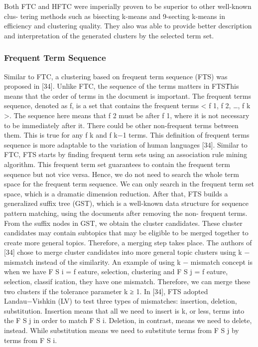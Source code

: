 \documentclass{VUMIFInfKursinis}
\begin{document}
Both FTC and HFTC were imperially proven to be superior to other well-known clus- tering methods such as bisecting k-means and 9-secting k-means in efficiency and clustering quality. They also was able to provide better description and interpretation of the generated clusters by the selected term set.

\subsubsection{Frequent Term Sequence}
Similar to FTC, a clustering based on frequent term sequence (FTS) was proposed in [34]. Unlike FTC, the sequence of the terms matters in FTS\. This means that the order of terms in the document is important. The frequent terms sequence, denoted as f, is a set that contains the frequent terms < f 1, f 2, \ldots, f k >. The sequence here means that f 2 must be after f 1, where it is not necessary to be immediately after it. There could be other non-frequent terms between them. This is true for any f k and f k−1 terms. This definition of frequent terms sequence is more adaptable to the variation of human languages [34].
Similar to FTC, FTS starts by finding frequent term sets using an association rule mining algorithm. This frequent term set guarantees to contain the frequent term sequence but not vice versa. Hence, we do not need to search the whole term space for the frequent term sequence. We can only search in the frequent term set space, which is a dramatic dimension reduction. After that, FTS builds a generalized suffix tree (GST), which is a well-known data structure for sequence pattern matching, using the documents after removing the non- frequent terms. From the suffix nodes in GST, we obtain the cluster candidates. These cluster candidates may contain subtopics that may be eligible to be merged together to create more general topics. Therefore, a merging step takes place.
The authors of [34] chose to merge cluster candidates into more general topic clusters using k − mismatch instead of the similarity. An example of using k − mismatch concept is when we have F S i = {f eature, selection, clustering} and F S j = {f eature, selection, classif ication}, they have one mismatch. Therefore, we can merge these two clusters if the tolerance parameter k ≥ 1. In [34], FTS adopted Landau−Vishkin (LV) to test three types of mismatches: insertion, deletion, substitution. Insertion means that all we need to insert is k, or less, terms into the F S j in order to match F S i. Deletion, in contrast, means we need to delete, instead. While substitution means we need to substitute terms from F S j by terms from F S i.
\end{document}
